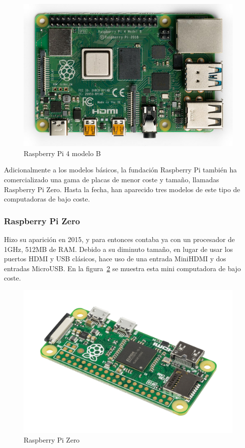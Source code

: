 \begin{figure}[tbp]
\centering
\includegraphics[scale = 0.3]{fig/Raspberry-Pi-4-modelo-B.jpg}
\caption{Raspberry Pi 4 modelo B}
\label{fig:raspberry-pi-4-modelo-B}
\end{figure}

Adicionalmente a los modelos básicos, la fundación Raspberry Pi también ha comercializado una gama de placas de menor coste y tamaño, llamadas Raspberry Pi Zero. Hasta la fecha, han aparecido tres modelos de este tipo de computadoras de bajo coste.

\subsubsection{Raspberry Pi Zero}

\noindent Hizo su aparición en 2015, y para entonces contaba ya con un procesador de 1GHz, 512MB de RAM. Debido a su diminuto tamaño, en lugar de usar los puertos HDMI y USB clásicos, hace uso de una entrada MiniHDMI y dos entradas MicroUSB. En la figura~\ref{fig:raspberry-pi-zero} se muestra esta mini computadora de bajo coste.

\begin{figure}[tbp]
\centering
\includegraphics[scale = 0.24]{fig/Raspberry-Pi-Zero.jpg}
\caption{Raspberry Pi Zero}
\label{fig:raspberry-pi-zero}
\end{figure}

